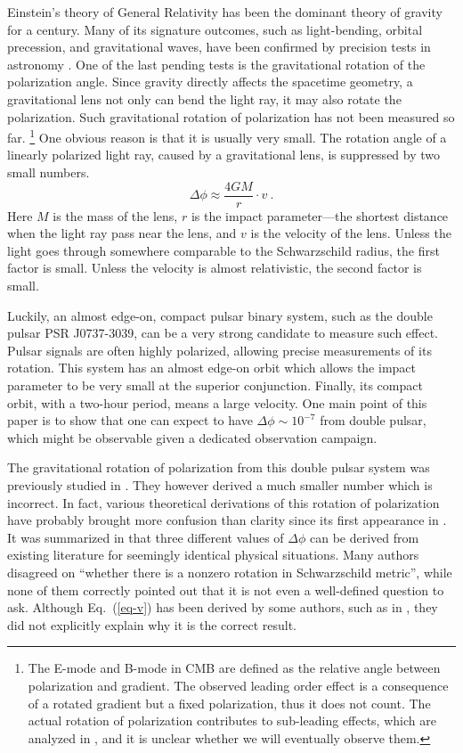 \documentclass[aps,showpacs,twocolumn,floats,prd,superscriptaddress,nofootinbib]{revtex4-1}
\begin{document}
Einstein's theory of General Relativity has been the dominant theory of gravity for a century. 
Many of its signature outcomes, such as light-bending, orbital precession, and gravitational waves, have been confirmed by precision tests in astronomy \cite{DysEdd20,KraSta97,WeiTay04,Abb16}. 
One of the last pending tests is the gravitational rotation of the polarization angle. 
Since gravity directly affects the spacetime geometry, a gravitational lens not only can bend the light ray, it may also rotate the polarization.
Such gravitational rotation of polarization has not been measured so far.
\footnote{The E-mode and B-mode in CMB are defined as the relative angle between polarization and gradient. 
The observed leading order effect is a consequence of a rotated gradient but a fixed polarization, thus it does not count.
The actual rotation of polarization contributes to sub-leading effects, which are analyzed in \cite{Dai14}, and it is unclear whether we will eventually observe them.} 
One obvious reason is that it is usually very small. 
The rotation angle of a linearly polarized light ray, caused by a gravitational lens, is suppressed by two small numbers.
\begin{equation}
\Delta\phi \approx \frac{4GM}{r} \cdot v~.
\label{eq-v}
\end{equation}
Here $M$ is the mass of the lens, $r$ is the impact parameter---the shortest distance when the light ray pass near the lens, and $v$ is the velocity of the lens.  
Unless the light goes through somewhere comparable to the Schwarzschild radius, the first factor is small. 
Unless the velocity is almost relativistic, the second factor is small. 

Luckily, an almost edge-on, compact pulsar binary system, such as the double pulsar PSR J0737-3039, can be a very strong candidate to measure such effect. 
Pulsar signals are often highly polarized, allowing precise measurements of its rotation.
This system has an almost edge-on orbit which allows the impact parameter to be very small at the superior conjunction.
Finally, its compact orbit, with a two-hour period, means a large velocity. 
One main point of this paper is to show that one can expect to have $\Delta\phi\sim 10^{-7}$ from double pulsar, which might be observable given a dedicated observation campaign.

The gravitational rotation of polarization from this double pulsar system was previously studied in \cite{RugTar06}. 
They however derived a much smaller number which is incorrect. 
In fact, various theoretical derivations of this rotation of polarization have probably brought more confusion  %
than clarity since its first appearance in \cite{Skr57}.
It was summarized in \cite{BroDem11} that three different values of $\Delta\phi$ can be derived from existing literature for seemingly identical physical situations.
Many authors disagreed on ``whether there is a nonzero rotation in Schwarzschild metric'', while none of them correctly pointed out that it is not even a well-defined question to ask.
Although Eq.~(\ref{eq-v}) has been derived by some authors, such as in \cite{KopMas01, Dai14}, they did not explicitly explain why it is the correct result.
\end{document}

